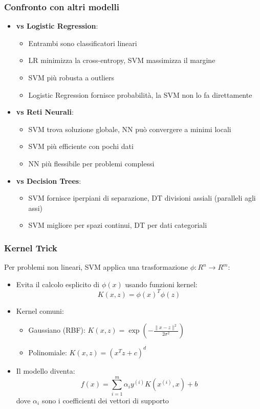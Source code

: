 \documentclass[10pt,oneside,a4paper]{article}
\begin{document}
	\subsubsection{Confronto con altri modelli}
	\begin{itemize}
		\item \textbf{vs Logistic Regression}:
		\begin{itemize}
			\item Entrambi sono classificatori lineari
			\item LR minimizza la cross-entropy, SVM massimizza il margine
			\item SVM più robusta a outliers
			\item Logistic Regression fornisce probabilità, la SVM non lo fa direttamente
		\end{itemize}
		
		\item \textbf{vs Reti Neurali}:
		\begin{itemize}
			\item SVM trova soluzione globale, NN può convergere a minimi locali
			\item SVM più efficiente con pochi dati
			\item NN più flessibile per problemi complessi
		\end{itemize}
		
		\item \textbf{vs Decision Trees}:
		\begin{itemize}
			\item SVM fornisce iperpiani di separazione, DT divisioni assiali (paralleli agli assi)
			\item SVM migliore per spazi continui, DT per dati categoriali
		\end{itemize}
	\end{itemize}
	
	\subsubsection{Kernel Trick}
	Per problemi non lineari, SVM applica una trasformazione $\phi: R^n \rightarrow R^m$:
	\begin{itemize}
		\item Evita il calcolo esplicito di $\phi(x)$ usando funzioni kernel:
		\[
		K(x,z) = \phi(x)^T\phi(z)
		\]
		
		\item Kernel comuni:
		\begin{itemize}
			\item Gaussiano (RBF): $K(x,z) = \exp\left(-\frac{\|x-z\|^2}{2\sigma^2}\right)$
			\item Polinomiale: $K(x,z) = (x^Tz + c)^d$
		\end{itemize}
		
		\item Il modello diventa:
		\[
		f(x) = \sum_{i=1}^m \alpha_i y^{(i)}K(x^{(i)},x) + b
		\]
		dove $\alpha_i$ sono i coefficienti dei vettori di supporto
	\end{itemize}
	
\end{document}
